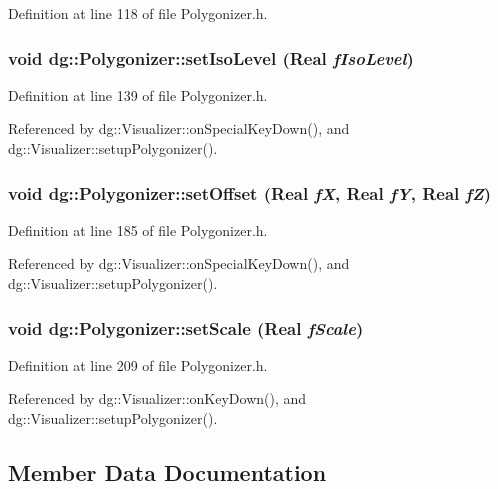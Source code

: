 Definition at line 118 of file Polygonizer.h.
\subsubsection{\setlength{\rightskip}{0pt plus 5cm}void dg::Polygonizer::set\-Iso\-Level ({\bf Real} {\em f\-Iso\-Level})\hspace{0.3cm}{\tt  [inline]}}\label{classdg_1_1Polygonizer_a7}




Definition at line 139 of file Polygonizer.h.

Referenced by dg::Visualizer::on\-Special\-Key\-Down(), and dg::Visualizer::setup\-Polygonizer().
\subsubsection{\setlength{\rightskip}{0pt plus 5cm}void dg::Polygonizer::set\-Offset ({\bf Real} {\em f\-X}, {\bf Real} {\em f\-Y}, {\bf Real} {\em f\-Z})\hspace{0.3cm}{\tt  [inline]}}\label{classdg_1_1Polygonizer_a9}




Definition at line 185 of file Polygonizer.h.

Referenced by dg::Visualizer::on\-Special\-Key\-Down(), and dg::Visualizer::setup\-Polygonizer().
\subsubsection{\setlength{\rightskip}{0pt plus 5cm}void dg::Polygonizer::set\-Scale ({\bf Real} {\em f\-Scale})\hspace{0.3cm}{\tt  [inline]}}\label{classdg_1_1Polygonizer_a11}




Definition at line 209 of file Polygonizer.h.

Referenced by dg::Visualizer::on\-Key\-Down(), and dg::Visualizer::setup\-Polygonizer().

\subsection{Member Data Documentation}
